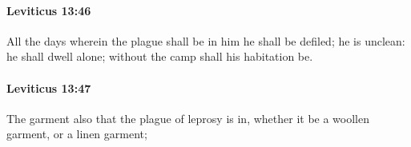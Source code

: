 		\paragraph{Leviticus 13:46} %
			\label{LEVITICUS-13-46}

			All the days wherein the plague shall be in him he shall be defiled; he is unclean: he shall dwell alone; without the camp shall his habitation be.


		\paragraph{Leviticus 13:47} %
			\label{LEVITICUS-13-47}

			The garment also that the plague of leprosy is in, whether it be a woollen garment, or a linen garment;


